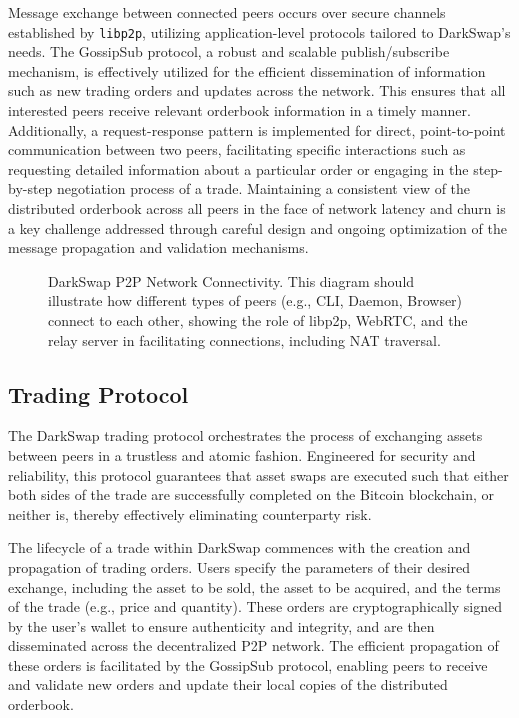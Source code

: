 \documentclass{article}
\begin{document}
Message exchange between connected peers occurs over secure channels established by \texttt{libp2p}, utilizing application-level protocols tailored to DarkSwap's needs. The GossipSub protocol, a robust and scalable publish/subscribe mechanism, is effectively utilized for the efficient dissemination of information such as new trading orders and updates across the network. This ensures that all interested peers receive relevant orderbook information in a timely manner. Additionally, a request-response pattern is implemented for direct, point-to-point communication between two peers, facilitating specific interactions such as requesting detailed information about a particular order or engaging in the step-by-step negotiation process of a trade. Maintaining a consistent view of the distributed orderbook across all peers in the face of network latency and churn is a key challenge addressed through careful design and ongoing optimization of the message propagation and validation mechanisms.
\begin{figure}[h!]
    \centering
    \caption{DarkSwap P2P Network Connectivity. This diagram should illustrate how different types of peers (e.g., CLI, Daemon, Browser) connect to each other, showing the role of libp2p, WebRTC, and the relay server in facilitating connections, including NAT traversal.}
    \label{fig:p2p_network}
\end{figure}
\subsection{Trading Protocol}
The DarkSwap trading protocol orchestrates the process of exchanging assets between peers in a trustless and atomic fashion. Engineered for security and reliability, this protocol guarantees that asset swaps are executed such that either both sides of the trade are successfully completed on the Bitcoin blockchain, or neither is, thereby effectively eliminating counterparty risk.

The lifecycle of a trade within DarkSwap commences with the creation and propagation of trading orders. Users specify the parameters of their desired exchange, including the asset to be sold, the asset to be acquired, and the terms of the trade (e.g., price and quantity). These orders are cryptographically signed by the user's wallet to ensure authenticity and integrity, and are then disseminated across the decentralized P2P network. The efficient propagation of these orders is facilitated by the GossipSub protocol, enabling peers to receive and validate new orders and update their local copies of the distributed orderbook.
\end{document}
